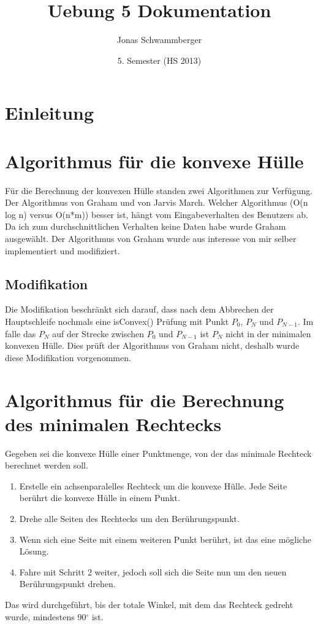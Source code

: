 \documentclass[10pt]{article}
\title{
	\vspace{5cm}
	Uebung 5 Dokumentation
}
\author{Jonas Schwammberger}
\date{5. Semester (HS 2013)}
\begin{document}
\maketitle
\thispagestyle{fancy}

\newpage

\tableofcontents	  	


\newpage
\setcounter{page}{1}


\section{Einleitung}

\section{Algorithmus für die konvexe Hülle}
Für die Berechnung der konvexen Hülle standen zwei Algorithmen zur Verfügung. Der Algorithmus von Graham und von Jarvis March. Welcher Algorithmus (O(n log n) versus O(n*m)) besser ist, hängt vom Eingabeverhalten des Benutzers ab. Da ich zum durchschnittlichen Verhalten keine Daten habe wurde Graham ausgewählt. Der Algorithmus von Graham wurde aus interesse von mir selber implementiert und modifiziert.

\subsection{Modifikation}
Die Modifikation beschränkt sich darauf, dass nach dem Abbrechen der Hauptschleife nochmals eine isConvex() Prüfung mit Punkt $P_{0}$, $P_N$ und $P_{N-1}$. Im falle das $P_N$ auf der Strecke zwischen $P_{0}$ und $P_{N-1}$ ist  $P_N$ nicht in der minimalen konvexen Hülle. Dies prüft der Algorithmus von Graham nicht, deshalb wurde diese Modifikation vorgenommen.

\section{Algorithmus für die Berechnung des minimalen Rechtecks}
Gegeben sei die konvexe Hülle einer Punktmenge, von der das minimale Rechteck berechnet werden soll.
\begin{enumerate}
	\item Erstelle ein achsenparalelles Rechteck um die konvexe Hülle. Jede Seite berührt die konvexe Hülle in einem Punkt.
	\item Drehe alle Seiten des Rechtecks um den Berührungspunkt.
	\item Wenn sich eine Seite mit einem weiteren Punkt berührt, ist das eine mögliche Lösung.
	\item Fahre mit Schritt 2 weiter, jedoch soll sich die Seite nun um den neuen Berührungspunkt drehen.
\end{enumerate}
Das wird durchgeführt, bis der totale Winkel, mit dem das Rechteck gedreht wurde, mindestens 90$^\circ$ ist.
\end{document}
